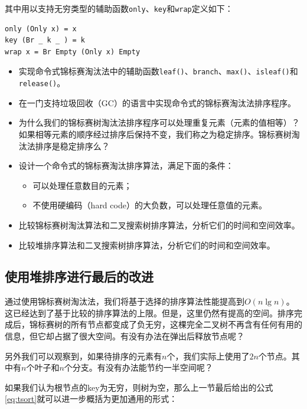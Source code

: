 \documentclass[b5paper]{ctexart}
\begin{document}
其中用以支持无穷类型的辅助函数\texttt{only}、\texttt{key}和\texttt{wrap}定义如下：

\lstset{language=Haskell}
\begin{lstlisting}[style=Haskell]
only (Only x) = x
key (Br _ k _ ) = k
wrap x = Br Empty (Only x) Empty
\end{lstlisting}

\begin{Exercise}
  \begin{itemize}
    \item 实现命令式锦标赛淘汰法中的辅助函数\texttt{leaf()}、\texttt{branch}、\texttt{max()}、\texttt{isleaf()}和\texttt{release()}。
    \item 在一门支持垃圾回收（GC）的语言中实现命令式的锦标赛淘汰法排序程序。
    \item 为什么我们的锦标赛树淘汰法排序程序可以处理重复元素（元素的值相等）？如果相等元素的顺序经过排序后保持不变，我们称之为稳定排序。锦标赛树淘汰法排序是稳定排序么？
    \item 设计一个命令式的锦标赛淘汰排序算法，满足下面的条件：
      \begin{itemize}
        \item 可以处理任意数目的元素；
        \item 不使用硬编码（hard code）的大负数，可以处理任意值的元素。
      \end{itemize}
    \item 比较锦标赛树淘汰算法和二叉搜索树排序算法，分析它们的时间和空间效率。
    \item 比较堆排序算法和二叉搜索树排序算法，分析它们的时间和空间效率。
  \end{itemize}
\end{Exercise}

\subsection{使用堆排序进行最后的改进}

通过使用锦标赛树淘汰法，我们将基于选择的排序算法性能提高到$O(n \lg n)$。这已经达到了基于比较的排序算法的上限\cite{TAOCP}。但是，这里仍然有提高的空间。排序完成后，锦标赛树的所有节点都变成了负无穷，这棵完全二叉树不再含有任何有用的信息，但它却占据了很大空间。有没有办法在弹出后释放节点呢？

另外我们可以观察到，如果待排序的元素有$n$个，我们实际上使用了$2n$个节点。其中有$n$个叶子和$n$个分支。有没有办法能节约一半空间呢？

如果我们认为根节点的key为无穷，则树为空，那么上一节最后给出的公式\ref{eq:tsort}就可以进一步概括为更加通用的形式：
\end{document}
